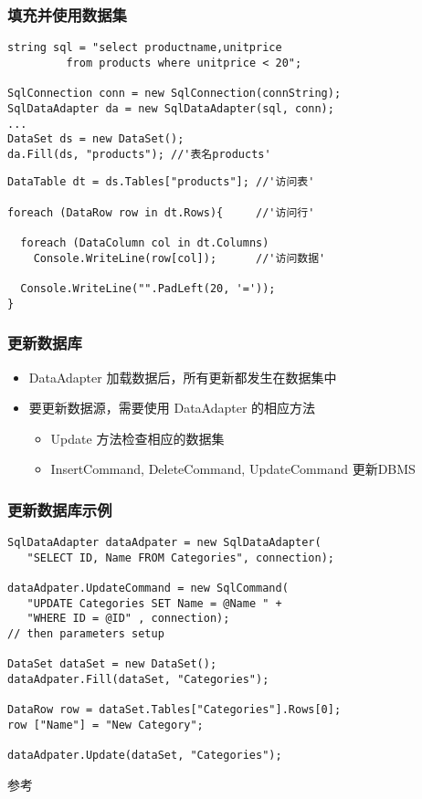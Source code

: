 \begin{frame}[fragile]
\frametitle{填充并使用数据集}   %
\begin{lstlisting}[escapeinside='']
string sql = "select productname,unitprice
         from products where unitprice < 20";

SqlConnection conn = new SqlConnection(connString);
SqlDataAdapter da = new SqlDataAdapter(sql, conn);
...
DataSet ds = new DataSet();
da.Fill(ds, "products"); //'表名products'
\end{lstlisting}
\pause
\begin{lstlisting}[escapeinside='']
DataTable dt = ds.Tables["products"]; //'访问表'

foreach (DataRow row in dt.Rows){     //'访问行'

  foreach (DataColumn col in dt.Columns)
    Console.WriteLine(row[col]);      //'访问数据'

  Console.WriteLine("".PadLeft(20, '='));
}
\end{lstlisting}
\end{frame}

\begin{frame}
\frametitle{更新数据库}
\begin{itemize}
\item DataAdapter 加载数据后，所有更新都发生在数据集中
\item 要更新数据源，需要使用  DataAdapter 的相应方法
  \begin{itemize}
  \item Update 方法检查相应的数据集
  \item InsertCommand, DeleteCommand, UpdateCommand 更新DBMS
  \end{itemize}
\end{itemize}
\begin{center}
  
\end{center}
\end{frame}

\begin{frame}[fragile]
\frametitle{更新数据库示例}
\begin{lstlisting}
SqlDataAdapter dataAdpater = new SqlDataAdapter(
   "SELECT ID, Name FROM Categories", connection);

dataAdpater.UpdateCommand = new SqlCommand(
   "UPDATE Categories SET Name = @Name " +
   "WHERE ID = @ID" , connection);
// then parameters setup

DataSet dataSet = new DataSet();
dataAdpater.Fill(dataSet, "Categories");   

DataRow row = dataSet.Tables["Categories"].Rows[0];
row ["Name"] = "New Category";

dataAdpater.Update(dataSet, "Categories");
\end{lstlisting}
参考 \href{http://msdn2.microsoft.com/zh-cn/library/33y2221y.aspx}
{}
\end{frame}

